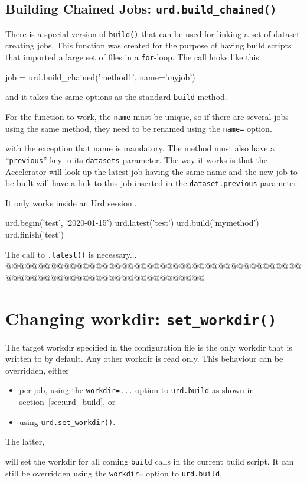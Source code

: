 \subsection{Building Chained Jobs: \texttt{urd.build\_chained()}}
There is a special version of \texttt{build()} that can be used for
linking a set of dataset-creating jobs.  This function was created for
the purpose of having build scripts that imported a large set of files
in a \texttt{for}-loop.  The call looks like this
\begin{python}
job = urd.build_chained('method1', name='myjob')
\end{python}
and it takes the same options as the standard \texttt{build} method.

For the function to work, the \texttt{name} must be unique, so if
there are several jobs using the same method, they need to be renamed using the \texttt{name=} option.

with the exception that name is mandatory.  The method must also have
a ``\texttt{previous}'' key in its \texttt{datasets} parameter.  The
way it works is that the Accelerator will look up the latest job
having the same name and the new job to be built will have a link to
this job inserted in the \texttt{dataset.previous} parameter.

It only works inside an Urd session...
\begin{python}
    urd.begin('test', '2020-01-15')
    urd.latest('test')
    urd.build('mymethod')
    urd.finish('test')
\end{python}
The call to \texttt{.latest()} is necessary...
@@@@@@@@@@@@@@@@@@@@@@@@@@@@@@@@@@@@@@@@@@@@@@@@@@@@@@@@@@@@@@@@@@@@@@@@@@@@@



\section{Changing workdir:  \texttt{set\_workdir()}}
The target workdir specified in the configuration file is the only
workdir that is written to by default.  Any other workdir is read
only.  This behaviour can be overridden, either
\begin{itemize}
\item[] per job, using the \texttt{workdir=...} option to \texttt{urd.build} as shown in section~\ref{sec:urd_build}, or
\item[] using \texttt{urd.set\_workdir()}.
\end{itemize}
The latter,
\begin{python}
def main(urd):
    urd.set_workdir(<workdir>)}
\end{python}
will set the workdir for all coming \texttt{build} calls in the
current build script.  It can still be overridden using
the \texttt{workdir=} option to \texttt{urd.build}.



